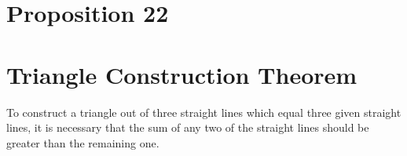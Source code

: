 
\renewcommand\qedsymbol{Q.E.F.}

\section*{Proposition 22}

\section{Triangle Construction Theorem}

\begin{thm}
To construct a triangle out of three straight lines which equal three given straight lines, it is necessary that the sum of any two of the straight lines should be greater than the remaining one.
\end{thm}


